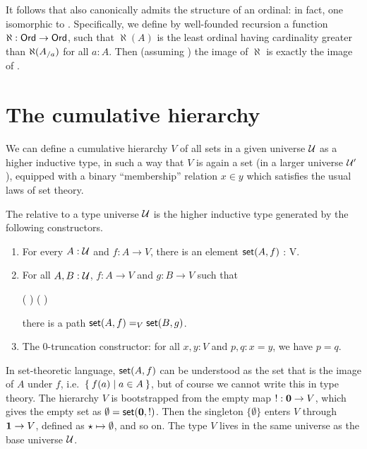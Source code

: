 It follows that \card also canonically admits the structure of an ordinal: in fact, one isomorphic to \ord.
Specifically, we define by well-founded recursion a function $\aleph:\ord\to\ord$, such that $\aleph(A)$ is the least ordinal having cardinality greater than $\aleph({\ordsl A a})$ for all $a:A$.
Then (assuming \choice{}) the image of $\aleph$ is exactly the image of \card.


\section{The cumulative hierarchy}
\label{sec:cumulative-hierarchy}

We can define a cumulative hierarchy $V$ of all sets in a given universe $\UU$ as a higher inductive type, in such a way that $V$ is again a set (in a larger universe $\UU'$), equipped with a binary ``membership'' relation $x\in y$ which satisfies the usual laws of set theory.

\begin{defn}\label{defn:V}
  The  relative to a type universe $\UU$ is the
  higher inductive type generated by the following constructors.
  \begin{enumerate}
  \item For every $A : \UU$ and $f : A \to V$, there is an element $\vset(A, f)$ : V.
  \item For all $A, B : \UU$, $f : A \to V$ and $g : B \to V$ such that
    \begin{narrowmultline} \label{eq:V-path}
      \big(  \big) \land \narrowbreak
      \big(  \big)
    \end{narrowmultline}
    there is a path $\id[V]{\vset(A,f)}{\vset(B,g)}$.
  \item The 0-truncation constructor: for all $x,y:V$ and $p,q:x=y$, we have $p=q$.
  \end{enumerate}
\end{defn}

In set-theoretic language, $\vset(A,f)$ can be understood as the set that is the image of $A$ under $f$, i.e.\ $\setof{ f(a) | a
\in A }$, but of course we cannot write this in type theory. The hierarchy $V$ is
bootstrapped from the empty map $! : \emptyt \to V$, which gives the empty set as $\emptyset = \vset(\emptyt,!)$.
Then the singleton $\{\emptyset\}$ enters $V$ through $\unit \to V$, defined as $\ttt \mapsto \emptyset$, and so
on. The type $V$ lives in the same universe as the base universe $\UU$.


